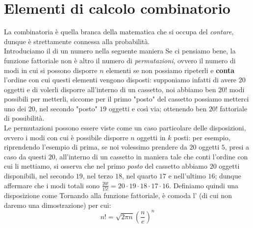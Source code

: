 \documentclass{report}
\begin{document}
	\section{Elementi di calcolo combinatorio}
	La combinatoria è quella branca della matematica che si occupa del \emph{contare}, dunque è strettamente connessa alla probabilità. \\
	Introduciamo il  di un numero nella seguente maniera
\noindent Se ci pensiamo bene, la funzione fattoriale non è altro il numero di \emph{permutazioni}, ovvero il numero di modi in cui si possono disporre $n$ elementi se non possiamo ripeterli e \textbf{conta} l'ordine con cui questi elementi vengono disposti: supponiamo infatti di avere $20$ oggetti e di volerli disporre all'interno di un cassetto, noi abbiamo ben $20!$ modi possibili per metterli, siccome per il primo "posto" del cassetto possiamo metterci uno dei $20$, nel secondo "posto" $19$ oggetti e così via; ottenendo ben $20!$ fattoriale di possibilità. \\
	Le permutazioni possono essere viste come un caso particolare delle disposizioni, ovvero i modi con cui è possibile disporre $n$ oggetti in $k$ posti: per esempio, riprendendo l'esempio di prima, se noi volessimo prendere da $20$ oggetti $5$, presi a caso da questi $20$, all'interno di un cassetto in maniera tale che conti l'ordine con cui li mettiamo, si osserva che nel primo \emph{posto} del cassetto abbiamo $20$ oggetti disponibili, nel secondo $19$, nel terzo $18$, nel quarto $17$ e nell'ultimo $16$; dunque affermare che i modi totali sono $\frac{20!}{15!} = 20 \cdot 19 \cdot 18 \cdot 17 \cdot 16$. Definiamo quindi una disposizione come
\noindent Tornando alla funzione fattoriale, è comoda l' (di cui non daremo una dimostrazione) per cui:
\begin{equation}
	n! = \sqrt{2\pi n} \left( \frac{n}{e} \right)^n
\end{equation}
\end{document}
